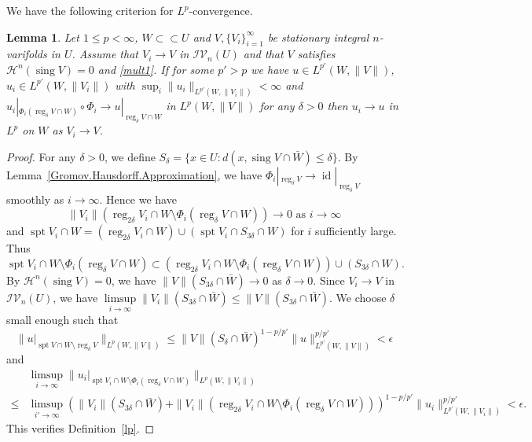 \documentclass[11pt]{amsart}
\newtheorem{lemma}[theorem]{Lemma}
\theoremstyle{definition}
\newcommand{\HH}{\mathcal{H}}
\newcommand{\IV}{\mathcal{IV}}
\newcommand{\ssubset}{\subset\subset}
\DeclareMathOperator{\spt}{spt}
\DeclareMathOperator{\sing}{sing}
\DeclareMathOperator{\reg}{reg}
\DeclareMathOperator{\id}{id}
\begin{document}
We have the following criterion for $L^p$-convergence.
\begin{lemma}\label{lp.convergence.criterion}
	Let $1 \le p < \infty$, $W \ssubset U$ and $V, \{V_i\}_{i=1}^\infty$ be stationary integral $n$-varifolds in $U$. Assume that $V_i \to V$ in $\IV_n(U)$ and that $V$ satisfies $\HH^{n}(\sing V)=0$ and \eqref{mult1}. If  for some $p'>p$ we have $u\in L^{p'}(W,\|V\|)$,  $u_i\in L^{p'}(W,\|V_i\|)$ with $\sup_i\|u_i\|_{L^{p'}(W,\|V_i\|)}<\infty$ and $u_i|_{\Phi_i(\reg_\delta V\cap W)}\circ \Phi_i\to u|_{\reg_\delta V\cap W}$ in $L^p(W,\|V\|)$ for any $\delta>0$ then $u_i\to u$ in $L^p$ on $W$ as $V_i\to V$.
\end{lemma}
\begin{proof}
	For any $\delta>0$, we define $S_\delta=\{x\in U:d(x,\sing V\cap \bar W)\le \delta\}$. By Lemma~\ref{Gromov.Hausdorff.Approximation}, we have $\Phi_i|_{\reg_\delta V}\to \id|_{\reg_{\delta}V}$ smoothly as $i\to\infty$. Hence we have 
	\[
		\|V_i\|(\reg_{2\delta}V_i\cap W\setminus\Phi_i(\reg_\delta V\cap W))\to0\text{ as }i\to\infty
	\]
	and $\spt V_i\cap W=  ( \reg_{2\delta} V_i\cap W) \cup (\spt V_i\cap S_{3\delta}\cap W)$ for $i$ sufficiently large. Thus 
	\[
	\spt V_i\cap W\setminus \Phi_i(\reg_\delta V\cap W)\subset (\reg_{2\delta}V_i\cap W\setminus\Phi_i(\reg_\delta V\cap W) )\cup (S_{3\delta}\cap W).
	\]
	By $\HH^{n}(\sing V)=0$, we have $\|V\|(S_{3\delta}\cap \bar W)\to0 $ as $\delta\to0$. Since $V_i\to V$ in $\IV_n(U)$, we have $\limsup\limits_{i\to\infty}\|V_i\|(S_{3\delta}\cap \bar W)\le \|V\|(S_{3\delta}\cap \bar W)$. We choose $\delta$ small enough such that 	\[\|u|_{\spt V\cap W\setminus \reg_\delta V}\|_{L^p(W,\|V\|)}\le \|V\|(S_{\delta}\cap \bar W)^{1-p/p'}\|u\|_{L^{p'}(W,\|V\|)}^{p/p'}<\epsilon\]
	and
	\[\begin{aligned}
		&\limsup_{i\to\infty}\|u_i|_{\spt V_i\cap W\setminus \Phi_i(\reg_\delta V\cap W)}\|_{L^p(W,\|V_i\|)}\\
		\le& \limsup_{i'\to\infty}(\|V_i\|(S_{3\delta}\cap \bar W)+\|V_i\|(\reg_{2\delta}V_i\cap W\setminus\Phi_i(\reg_\delta V\cap W)))^{1-p/p'}\|u_i\|_{L^{p'}(W,\|V_i\|)}^{p/p'}<\epsilon.
	\end{aligned} \]
	This verifies Definition~\ref{lp}.
\end{proof}
\end{document}
